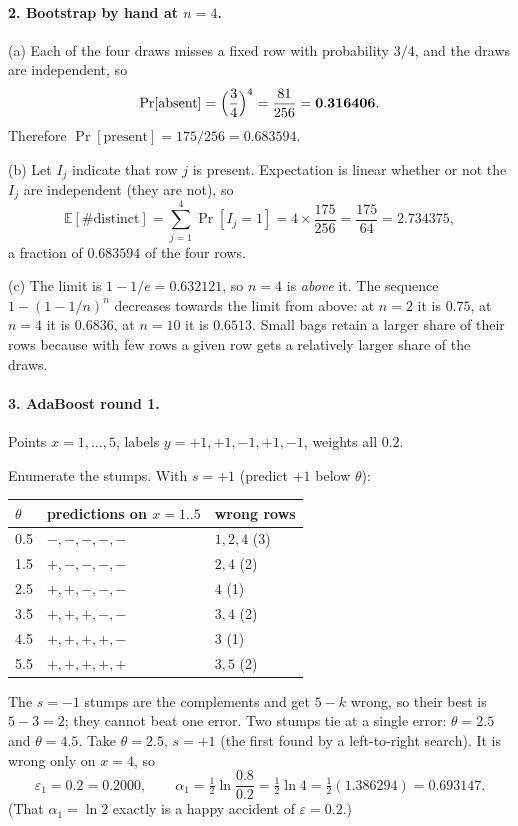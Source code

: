 \documentclass[11pt]{article}
\begin{document}
\paragraph{2. Bootstrap by hand at $n = 4$.}
(a) Each of the four draws misses a fixed row with probability $3/4$, and the
draws are independent, so
\[
  \Pr[\text{absent}] = \Bigl(\frac{3}{4}\Bigr)^{4}
  = \frac{81}{256} = \mathbf{0.316406}.
\]
Therefore $\Pr[\text{present}] = 175/256 = 0.683594$.

(b) Let $I_j$ indicate that row $j$ is present. Expectation is linear whether
or not the $I_j$ are independent (they are not), so
\[
  \mathbb{E}[\#\text{distinct}] = \sum_{j=1}^{4}\Pr[I_j = 1]
  = 4 \times \frac{175}{256} = \frac{175}{64} = \mathbf{2.734375},
\]
a fraction of $0.683594$ of the four rows.

(c) The limit is $1 - 1/e = 0.632121$, so $n = 4$ is \emph{above} it. The
sequence $1 - (1-1/n)^n$ decreases towards the limit from above: at $n = 2$ it
is $0.75$, at $n = 4$ it is $0.6836$, at $n = 10$ it is $0.6513$. Small bags
retain a larger share of their rows because with few rows a given row gets a
relatively larger share of the draws.

\paragraph{3. AdaBoost round 1.}
Points $x = 1,\dots,5$, labels $y = +1, +1, -1, +1, -1$, weights all $0.2$.

Enumerate the stumps. With $s = +1$ (predict $+1$ below $\theta$):
\begin{center}
\begin{tabular}{lll}
  \toprule
  $\theta$ & predictions on $x = 1..5$ & wrong rows \\
  \midrule
  0.5 & $-,-,-,-,-$ & $1, 2, 4$ \quad (3) \\
  1.5 & $+,-,-,-,-$ & $2, 4$ \quad (2) \\
  2.5 & $+,+,-,-,-$ & $4$ \quad (1) \\
  3.5 & $+,+,+,-,-$ & $3, 4$ \quad (2) \\
  4.5 & $+,+,+,+,-$ & $3$ \quad (1) \\
  5.5 & $+,+,+,+,+$ & $3, 5$ \quad (2) \\
  \bottomrule
\end{tabular}
\end{center}
The $s = -1$ stumps are the complements and get $5 - k$ wrong, so their best
is $5 - 3 = 2$; they cannot beat one error. Two stumps tie at a single error:
$\theta = 2.5$ and $\theta = 4.5$. Take $\theta = 2.5$, $s = +1$ (the first
found by a left-to-right search). It is wrong only on $x = 4$, so
\[
  \varepsilon_1 = 0.2 = \mathbf{0.2000},
  \qquad
  \alpha_1 = \tfrac12\ln\frac{0.8}{0.2} = \tfrac12\ln 4
           = \tfrac12(1.386294) = \mathbf{0.693147}.
\]
(That $\alpha_1 = \ln 2$ exactly is a happy accident of $\varepsilon = 0.2$.)
\end{document}
